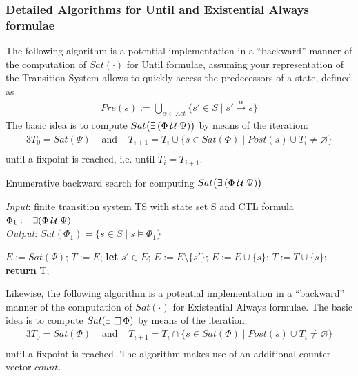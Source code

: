 \documentclass{article}
\begin{document}
\subsubsection{Detailed Algorithms for Until and Existential Always formulae}
The following algorithm is a potential implementation in a ``backward'' manner
of the computation of $Sat(\cdot)$ for Until formulae, 
assuming your representation of the Transition System allows to 
quickly access the predecessors of a state, defined as 
\begin{align*}
    Pre(s) := \bigcup_{\alpha \in Act} \{ s' \in S \mid s' \xrightarrow{\alpha} s \}
\end{align*}
The basic idea is to compute $Sat\big(\exists \, (\Phi \mathbin{\mathcal{U}} \Psi) \big)$ by means of the iteration: 
\begin{alignat*}{3}
    T_0 = Sat(\Psi) & \text{ and } & T_{i+1} = T_i \cup \{ s \in Sat(\Phi) \mid Post(s) \cup T_i \neq \varnothing \} \\
\end{alignat*}
until a fixpoint is reached, i.e. until $T_i = T_{i+1}$.

\begin{algorithm}[H]
    \caption{Enumerative backward search for computing $Sat\big(\exists \, (\Phi \mathbin{\mathcal{U}} \Psi) \big)$}
    \hspace*{\algorithmicindent} \emph{Input}: finite transition system TS with state set S and CTL formula $\Phi_1 := \exists (\Phi \mathbin{\mathcal{U}} \Psi)$ \\
    \hspace*{\algorithmicindent} \emph{Output}: $Sat(\Phi_1) = \{ s \in S \mid s \vDash \Phi_1 \}$
    \begin{algorithmic}[1]
        \State $E := Sat(\Psi)$;
        \State $T := E$;
            \State \textbf{let} $s' \in E$;
            \State $E := E \setminus \{ s' \}$;
                    \State $E := E \cup \{s\}$;
                    \State $T := T \cup \{s\}$;
                \EndIf
            \EndFor
        \EndWhile
    \State \textbf{return} T;
    \end{algorithmic}
\end{algorithm}

Likewise, the following algorithm is a potential implementation in a ``backward'' manner 
of the computation of $Sat(\cdot)$ for Existential Always formulae. The basic idea is to 
compute $Sat(\exists \, \mathop{\Box} \Phi)$ by means of the iteration: 
\begin{alignat*}{3}
    T_0 = Sat(\Phi) & \text{ and } & T_{i+1} = T_i \cap \{ s \in Sat(\Phi) \mid Post(s) \cup T_i \neq \varnothing \} \\
\end{alignat*}
until a fixpoint is reached. The algorithm makes use of an additional counter vector $count$.
\end{document}
